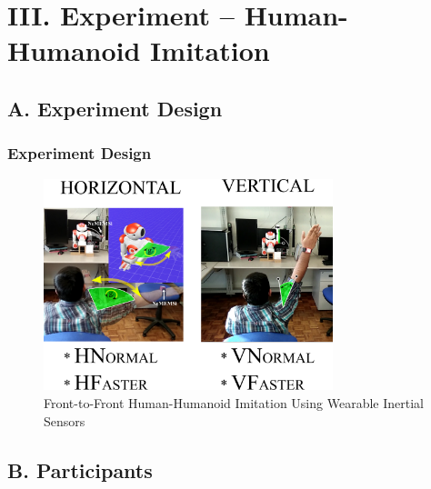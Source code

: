 \documentclass{beamer}
\begin{document}
\section{III. Experiment -- Human-Humanoid Imitation}



\subsection{A. Experiment Design}

\begin{frame}
\frametitle{ Experiment Design }
\vspace{-0.7cm}


\begin{figure}[!htb]
\centering
\includegraphics[width=0.75\textwidth]{Xochicale2017Presentation}
\caption[PA]{Front-to-Front Human-Humanoid Imitation Using Wearable Inertial Sensors
}
\label{fig:sn}
\end{figure}

\end{frame}





\subsection{B. Participants}
\end{document}
